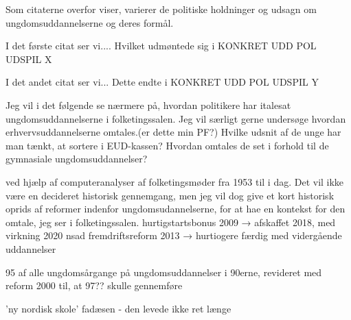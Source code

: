 Som citaterne overfor viser, varierer de politiske holdninger og udsagn om ungdomsuddannelserne og deres formål.

I det første citat ser vi....
Hvilket udmøntede sig i KONKRET UDD POL UDSPIL X

I det andet citat ser vi...
Dette endte i KONKRET UDD POL UDSPIL Y

Jeg vil i det følgende se nærmere på, hvordan politikere har italesat ungdomsuddannelserne i folketingssalen.
Jeg vil særligt gerne undersøge hvordan  erhvervsuddannelserne omtales.\todo(er dette min PF?)
Hvilke udsnit af de unge har man tænkt, at sortere i EUD-kassen?
Hvordan omtales de set i forhold til de gymnasiale ungdomsuddannelser? 

ved hjælp af computeranalyser af folketingsmøder fra 1953 til i dag.
Det vil ikke være en decideret historisk gennemgang, men jeg vil dog give et kort historisk oprids af reformer indenfor ungdomsudannelserne, for at hae en kontekst for den omtale, jeg ser i folketingssalen.
hurtigstartsbonus 2009 → afskaffet 2018, med virkning 2020
nsad
fremdriftsreform 2013 → hurtiogere færdig med vidergående uddannelser


95 \perc af alle ungdomsårgange på ungdomsuddannelser i 90erne, revideret med reform 2000 til, at 97?? skulle gennemføre

'ny nordisk skole' fadæsen - den levede ikke ret længe
